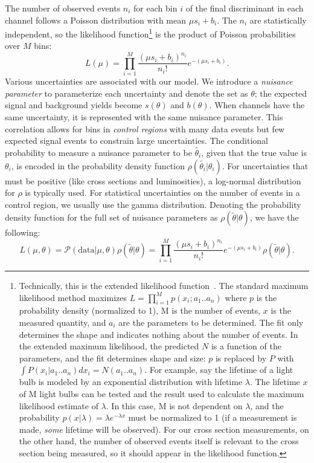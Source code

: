 \clearpage
The number of observed events $n_i$ for each bin $i$ of the final discriminant
in each channel follows a Poisson distribution with mean $\mu s_i + b_i$. The
$n_i$ are statistically independent, so the likelihood
function\footnote{Technically, this is the extended likelihood
function~\cite{BARLOW1990496}. The standard maximum likelihood method maximizes
$L = \prod_{i=1}^M p(x_i; a_1..a_n)$ where $p$ is the probability density
(normalized to 1), M is the number of events, $x$ is the measured quantity, and
$a_i$ are the parameters to be determined. The fit only determines the shape and
indicates nothing about the number of events. In the extended maximum likelihood, the
predicted $N$ is a function of the parameters, and the fit determines shape and
size: $p$ is replaced by $P$ with $\int P(x_i| a_1..a_n)dx_i = N(a_1..a_n)$. For
example, say the lifetime of a light bulb is modeled by an exponential
distribution with lifetime $\lambda$. The lifetime $x$ of M light
bulbs can be tested and the result used to calculate the maximum likelihood estimate of $\lambda$. In
this case, M is not dependent on $\lambda$, and the probability
$p(x|\lambda)=\lambda e^{-\lambda x}$ must be normalized to 1 (if a
measurement is made, \emph{some} lifetime will be observed). For our cross section
measurements, on the other hand, the number of observed events itself is
relevant to the cross section being measured, so it should appear in the
likelihood function.} is the product of Poisson probabilities over $M$ bins:
\begin{equation}
  L(\mu) = \prod_{i=1}^{M} \frac{(\mu s_i + b_i)^{n_i}}{n_i!} e^{-(\mu s_i + b_i)}.
\end{equation}
Various uncertainties are associated with our model. We introduce a
\emph{nuisance parameter} to parameterize each uncertainty and denote the set
as $\theta$; the expected signal and background yields become $s(\theta)$ and
$b(\theta)$. When channels have the same uncertainty, it is represented with the
same nuisance parameter. This correlation allows for bins in \emph{control
regions} with many data events but few expected signal events to constrain large
uncertainties. The conditional probability to measure a nuisance parameter to be
$\widetilde{\theta_i}$, given that the true value is $\theta_i$, is encoded in
the probability density function $\rho(\widetilde{\theta_i}|\theta_i)$. For
uncertainties that must be positive (like cross sections and luminosities),
a log-normal distribution for $\rho$ is typically used. For statistical uncertainties
on the number of events in a control region, we usually use the gamma
distribution. Denoting the probability density function for the full set of
nuisance parameters as $\rho(\widetilde{\theta}|\theta)$, we have the following:
\begin{equation}
  \label{eq:likelihood}
  L(\mu, \theta) = \mathcal{P}(\text{data}|\mu, \theta)\rho(\widetilde{\theta}|\theta) = \prod_{i=1}^{M} \frac{(\mu s_i + b_i)^{n_i}}{n_i!} e^{-(\mu s_i + b_i)} \rho(\widetilde{\theta}|\theta).
\end{equation}

